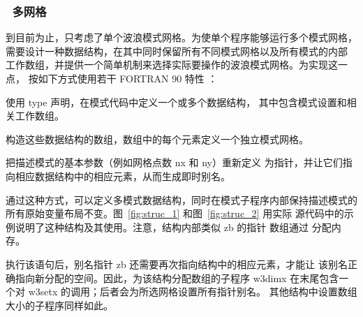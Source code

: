 \vsssub
\subsubsection{~多网格} \label{sec:mgrids}
\vsssub

到目前为止，只考虑了单个波浪模式网格。为使单个程序能够运行多个模式网格，
需要设计一种数据结构，在其中同时保留所有不同模式网格以及所有模式的内部
工作数组，并提供一个简单机制来选择实际要操作的波浪模式网格。为实现这一点，
按如下方式使用若干 FORTRAN 90 特性 \citep[例如][]{bk:MR99}：

\begin{list}{}{\rightmargin 8mm \leftmargin 10mm }

\item [1)] 使用 {\F type} 声明，在模式代码中定义一个或多个数据结构，
           其中包含模式设置和相关工作数组。

\item [2)] 构造这些数据结构的数组，数组中的每个元素定义一个独立模式网格。

\item [3)] 把描述模式的基本参数（例如网格点数 {\F nx} 和 {\F ny}）重新定义
           为指针，并让它们指向相应数据结构中的相应元素，从而生成即时别名。

\end{list}

\noindent
通过这种方式，可以定义多模式数据结构，同时在模式子程序内部保持描述模式的
所有原始变量布局不变。图~\ref{fig:struc_1} 和图~\ref{fig:struc_2} 用实际
源代码中的示例说明了这种结构及其使用。注意，结构内部类似 {\F zb} 的指针
数组通过  分配内存。

执行该语句后，别名指针 {\F zb} 还需要再次指向结构中的相应元素，才能让
该别名正确指向新分配的空间。因此，为该结构分配数组的子程序 {\F w3dimx}
在末尾包含一个对 {\F w3setx} 的调用；后者会为所选网格设置所有指针别名。
其他结构中设置数组大小的子程序同样如此。


